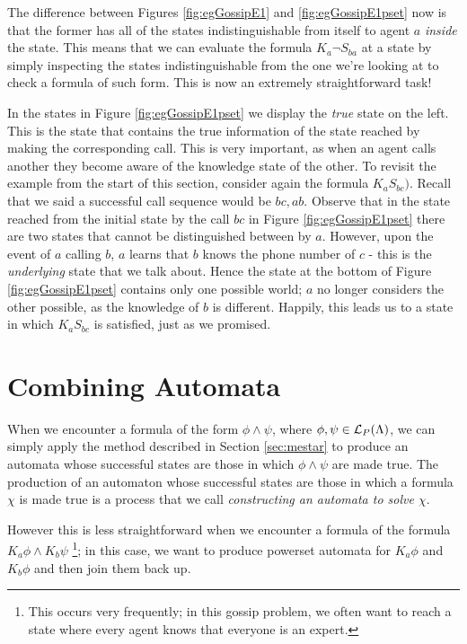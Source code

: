 \documentclass[10pt, a4paper]{report}
\begin{document}
The difference between Figures \ref{fig:egGossipE1} and \ref{fig:egGossipE1pset}
now is that the former has all of the states indistinguishable from itself to
agent $a$ \emph{inside} the state. This means that we can evaluate the formula
$K_a \neg S_{ba}$ at a state by simply inspecting the states indistinguishable
from the one we're looking at to check a formula of such form. This is now an
extremely straightforward task!

In the states in Figure \ref{fig:egGossipE1pset} we display the \emph{true} state on the left.
This is the state that contains the true information of the state reached by
making the corresponding call. This is very important, as when an agent calls
another they become aware of the knowledge state of the other. To revisit the
example from the start of this section, consider again the formula $K_a S_{bc})$.
Recall that we said a successful call sequence would be $bc, ab$. Observe that
in the state reached from the initial state by the call $bc$ in Figure
\ref{fig:egGossipE1pset} there are two states that cannot be distinguished
between by $a$. However, upon the event of $a$ calling $b$, $a$ learns that $b$
knows the phone number of $c$ - this is the \emph{underlying} state that we talk
about. Hence the state at the bottom of Figure \ref{fig:egGossipE1pset} contains
only one possible world; $a$ no longer considers the other possible, as the
knowledge of $b$ is different. Happily, this leads us to a state in which $K_a
S_{bc}$ is satisfied, just as we promised. 

\section{Combining Automata}

When we encounter a formula of the form $\phi \land \psi$, where $\phi, \psi \in
\mathcal{L}_P(\Lambda)$, we can simply apply the method described in Section
\ref{sec:mestar} to produce an automata whose successful states are those in
which $\phi \land \psi$ are made true. The production of an automaton whose
successful states are those in which a formula $\chi$ is made true is a process
that we call \emph{constructing an automata to solve $\chi$}.

However this is less straightforward when we encounter a formula of the formula
$K_a \phi \land K_b \psi$ \footnote{This occurs very frequently; in this gossip
  problem, we often want to reach a state where every agent knows that everyone
  is an expert.}; in this case, we want to produce powerset automata for $K_a
\phi$ and $K_b \phi$ and then join them back up.
\end{document}
